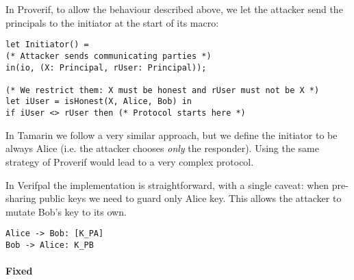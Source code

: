 In Proverif, to allow the behaviour described above, we let the attacker send the principals to the initiator at the start of its macro:

\lstset{language=proverif}
\begin{lstlisting}
let Initiator() =
(* Attacker sends communicating parties *)
in(io, (X: Principal, rUser: Principal));

(* We restrict them: X must be honest and rUser must not be X *)
let iUser = isHonest(X, Alice, Bob) in
if iUser <> rUser then (* Protocol starts here *)
\end{lstlisting}

In Tamarin we follow a very similar approach, but we define the initiator to be always Alice (i.e. the attacker chooses \textit{only} the responder). Using the same strategy of Proverif would lead to a very complex protocol.

In Verifpal the implementation is straightforward, with a single caveat: when pre-sharing public keys we need to guard only Alice key. This allows the attacker to mutate Bob's key to its own.

\lstset{language=verifpal}
\begin{lstlisting} 
Alice -> Bob: [K_PA]
Bob -> Alice: K_PB
\end{lstlisting}


\paragraph{Fixed}